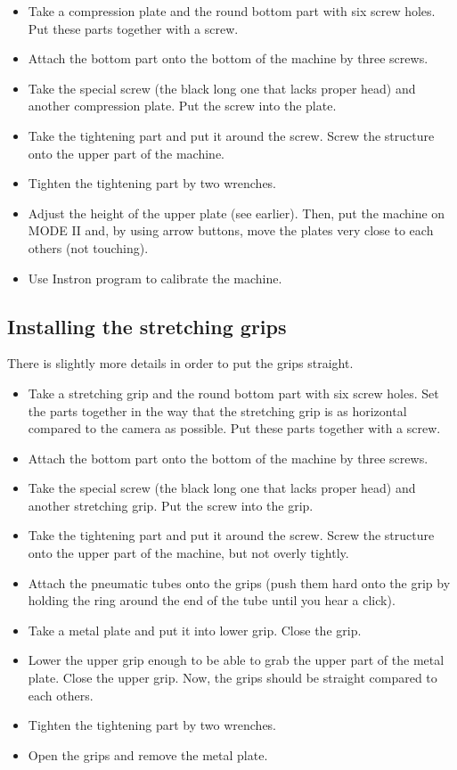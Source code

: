 \documentclass[a4paper]{article}
\begin{document}
\begin{itemize}
  \item Take a compression plate and the round bottom part with six screw holes. Put these parts together with a screw.
  \item Attach the bottom part onto the bottom of the machine by three screws.
  \item Take the special screw (the black long one that lacks proper head) and another compression plate. Put the screw into the plate.
  \item Take the tightening part and put it around the screw. Screw the structure onto the upper part of the machine.
  \item Tighten the tightening part by two wrenches.
  \item Adjust the height of the upper plate (see earlier). Then, put the machine on \textsf{MODE II} and, by using arrow buttons, move the plates very close to each others (not touching).
  \item Use Instron program to calibrate the machine.
\end{itemize}

\subsection{Installing the stretching grips}

There is slightly more details in order to put the grips straight.

\begin{itemize}
  \item Take a stretching grip and the round bottom part with six screw holes. Set the parts together in the way that the stretching grip is as horizontal compared to the camera as possible. Put these parts together with a screw.
  \item Attach the bottom part onto the bottom of the machine by three screws.
  \item Take the special screw (the black long one that lacks proper head) and another stretching grip. Put the screw into the grip.
  \item Take the tightening part and put it around the screw. Screw the structure onto the upper part of the machine, but not overly tightly.
  \item Attach the pneumatic tubes onto the grips (push them hard onto the grip by holding the ring around the end of the tube until you hear a click).
  \item Take a metal plate and put it into lower grip. Close the grip.
  \item Lower the upper grip enough to be able to grab the upper part of the metal plate. Close the upper grip. Now, the grips should be straight compared to each others.
  \item Tighten the tightening part by two wrenches.
  \item Open the grips and remove the metal plate.
\end{itemize}
\end{document}
